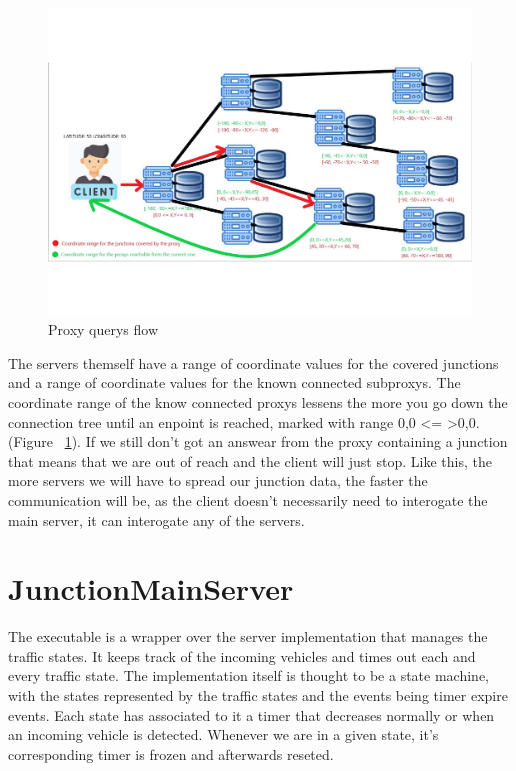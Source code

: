 \documentclass[17pt]{report}
\begin{document}
\begin{figure}[h!]
    \includegraphics[width=\textwidth]{Sketches/ProxyFlowV2.png}
    \caption{Proxy querys flow}
    \label{fig:Proxy querys flow}
\end{figure}

The servers themself have a range of coordinate values for the covered junctions
and a range of coordinate values for the known connected subproxys. The coordinate 
range of the know connected proxys lessens the more you go down the connection tree 
until an enpoint is reached, marked with range {0,0} \textless = \textgreater {0,0}.
(Figure ~\ref{fig:Proxy querys flow}). If we still don't got 
an answear from the proxy containing a junction that means that we are out of reach 
and the client will just stop. Like this, the more servers we will have to spread our 
junction data, the faster the communication will be, as the client doesn't necessarily
need to interogate the main server, it can interogate any of the servers.
\pagebreak


\section{JunctionMainServer}

\indent \indent
The executable is a wrapper over the server implementation that manages the traffic states.
It keeps track of the incoming vehicles and times out each and every traffic state. The 
implementation itself is thought to be a state machine, with the states represented by the 
traffic states and the events being timer expire events. Each state has associated to it 
a timer that decreases normally or when an incoming vehicle is detected. Whenever we 
are in a given state, it's corresponding timer is frozen and afterwards reseted.
\end{document}
